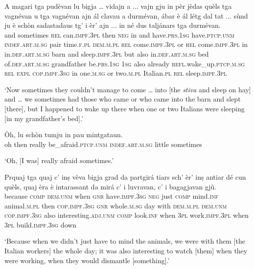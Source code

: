 \begin{linenumbers}
\gll A  magari tga pudèvan lu bigja … vidajn a ... vajn gju in pèr jèdas quèls tga vagnévan u tga vagnévan ajn ál clavau a durmévan, ábar è ál létg\footnotemark{} dal tat ... sùnd ju è schòn sadastadaus tg' i èr' ajn ... in né dus taljánars tga durmévan.\\
and sometimes  \textsc{rel} can.\textsc{impf.3pl} then \textsc{neg} {} in and {} have.\textsc{prs.1sg} have.\textsc{ptcp.unm} \textsc{indef.art.m.sg} pair  time.\textsc{f.pl} \textsc{dem.m.pl} \textsc{rel} come.\textsc{impf.3pl} or \textsc{rel} come.\textsc{impf.3pl} in in.\textsc{def.art.m.sg} barn and sleep.\textsc{impf.3pl} but also in.\textsc{def.art.m.sg} bed of.\textsc{def.art.m.sg} grandfather {} be.\textsc{prs.1sg} \textsc{1sg} also already \textsc{refl.}wake\_up.\textsc{ptcp.m.sg} \textsc{rel} \textsc{expl} \textsc{cop.impf.3sg} in {} one.\textsc{m.sg} or two.\textsc{m.pl} Italian.\textsc{pl} \textsc{rel} sleep.\textsc{impf.3pl}  \\
\end{linenumbers}
\medskip
\glt `Now sometimes they couldn’t manage to come … into [the \textit{stiva} and sleep on hay] and … we sometimes had those who came or who came into the barn and slept [there], but I happened to wake up there when one or two Italians were sleeping [in my grandfather’s bed].'
\medskip

\begin{linenumbers}
\gll  Òh, lu schòn tumju in pau mintgataun.  \\
oh then really be\_afraid.\textsc{ptcp.unm} \textsc{indef.art.m.sg} little sometimes  \\
\end{linenumbers}
\medskip
\glt `Oh, [I was] really afraid sometimes.'
\medskip

\begin{linenumbers}
\gll  Prquaj tga quaj c’ inṣ vèva bigja grad da partgirá tiars sch’ èr’ inṣ antiar dé cun quèls, quaj èra è intarassant da mirá c’ i luvravan, c' i bagagjavan gjù.  \\
because \textsc{comp} \textsc{dem.unm} when \textsc{gnr} have.\textsc{impf.3sg}  \textsc{neg} just \textsc{comp} mind.\textsc{inf} animal.\textsc{m.pl} then \textsc{cop.impf.3sg} \textsc{gnr} whole.\textsc{m.sg} day with \textsc{dem.m.pl} \textsc{dem.unm} \textsc{cop.impf.3sg} also interesting.\textsc{adj.unm} \textsc{comp} look.\textsc{inf} when \textsc{3pl} work.\textsc{impf.3pl} when \textsc{3pl} build.\textsc{impf.3sg} down\\
\end{linenumbers}
\medskip
\glt `Because when we didn’t just have to mind the animals, we were with them [the Italian workers] the whole day; it was also interesting to watch [them] when they were working, when they would dismantle [something].'
\medskip

